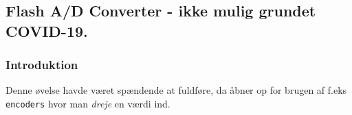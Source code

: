 \subsection{Flash A/D Converter - ikke mulig grundet COVID-19.}

\subsubsection{Introduktion}
Denne øvelse havde været spændende at fuldføre, da åbner op for brugen af f.eks \texttt{encoders} hvor man \textit{dreje} en værdi ind.

